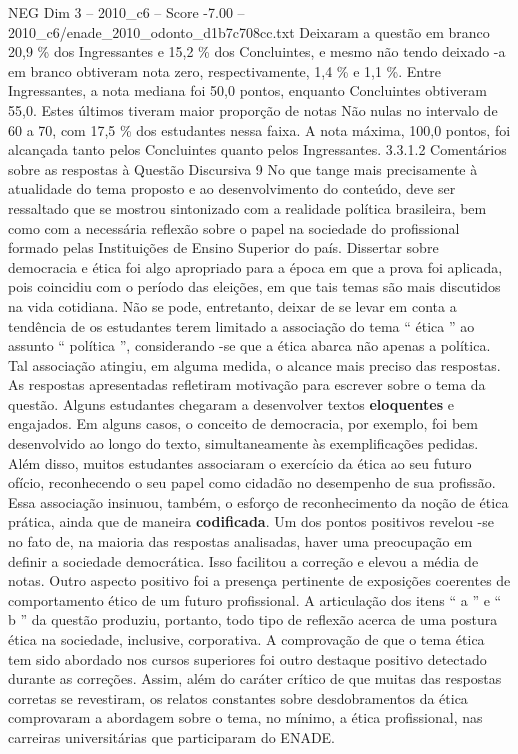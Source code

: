 \begin{textsample}{NEG Dim 3 – 2010\_c6 – Score -7.00 – 2010\_c6/enade\_2010\_odonto\_d1b7c708cc.txt}
Deixaram a questão em branco 20,9 \% dos Ingressantes e 15,2 \% dos Concluintes, e mesmo não tendo deixado -a em branco obtiveram nota zero, respectivamente, 1,4 \% e 1,1 \%.
Entre Ingressantes, a nota mediana foi 50,0 pontos, enquanto Concluintes obtiveram 55,0.
Estes últimos tiveram maior proporção de notas Não nulas no intervalo de 60 a 70, com 17,5 \% dos estudantes nessa faixa.
A nota máxima, 100,0 pontos, foi alcançada tanto pelos Concluintes quanto pelos Ingressantes. 3.3.1.2 Comentários sobre as respostas à Questão Discursiva 9 No que tange mais precisamente à atualidade do tema proposto e ao desenvolvimento do conteúdo, deve ser ressaltado que se mostrou sintonizado com a realidade política brasileira, bem como com a necessária reflexão sobre o papel na sociedade do profissional formado pelas Instituições de Ensino Superior do país.
Dissertar sobre democracia e ética foi algo apropriado para a época em que a prova foi aplicada, pois coincidiu com o período das eleições, em que tais temas são mais discutidos na vida cotidiana.
Não se pode, entretanto, deixar de se levar em conta a tendência de os estudantes terem limitado a associação do tema “ ética ” ao assunto “ política ”, considerando -se que a ética abarca não apenas a política.
Tal associação atingiu, em alguma medida, o alcance mais preciso das respostas.
As respostas apresentadas refletiram motivação para escrever sobre o tema da questão.
Alguns estudantes chegaram a desenvolver textos \textbf{eloquentes} e engajados.
Em alguns casos, o conceito de democracia, por exemplo, foi bem desenvolvido ao longo do texto, simultaneamente às exemplificações pedidas.
Além disso, muitos estudantes associaram o exercício da ética ao seu futuro ofício, reconhecendo o seu papel como cidadão no desempenho de sua profissão.
Essa associação insinuou, também, o esforço de reconhecimento da noção de ética prática, ainda que de maneira \textbf{codificada}.
Um dos pontos positivos revelou -se no fato de, na maioria das respostas analisadas, haver uma preocupação em definir a sociedade democrática.
Isso facilitou a correção e elevou a média de notas.
Outro aspecto positivo foi a presença pertinente de exposições coerentes de comportamento ético de um futuro profissional.
A articulação dos itens “ a ” e “ b ” da questão produziu, portanto, todo tipo de reflexão acerca de uma postura ética na sociedade, inclusive, corporativa.
A comprovação de que o tema ética tem sido abordado nos cursos superiores foi outro destaque positivo detectado durante as correções.
Assim, além do caráter crítico de que muitas das respostas corretas se revestiram, os relatos constantes sobre desdobramentos da ética comprovaram a abordagem sobre o tema, no mínimo, a ética profissional, nas carreiras universitárias que participaram do ENADE.

\end{textsample}
